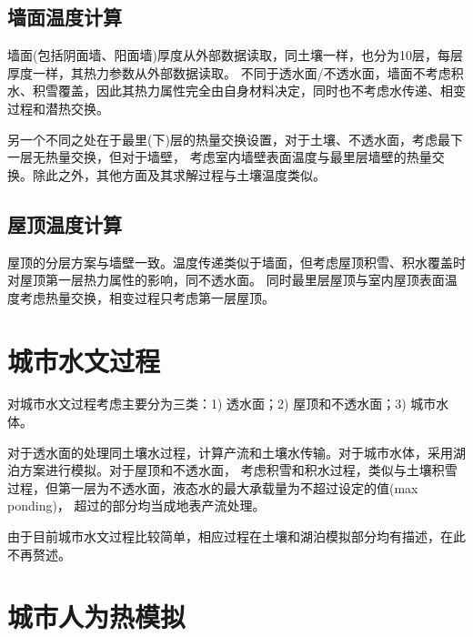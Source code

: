 \subsection{墙面温度计算}
墙面(包括阴面墙、阳面墙)厚度从外部数据读取，同土壤一样，也分为10层，每层厚度一样，其热力参数从外部数据读取。
不同于透水面/不透水面，墙面不考虑积水、积雪覆盖，因此其热力属性完全由自身材料决定，同时也不考虑水传递、相变过程和潜热交换。

另一个不同之处在于最里(下)层的热量交换设置，对于土壤、不透水面，考虑最下一层无热量交换，但对于墙壁，
考虑室内墙壁表面温度与最里层墙壁的热量交换。除此之外，其他方面及其求解过程与土壤温度类似。


\subsection{屋顶温度计算}
屋顶的分层方案与墙壁一致。温度传递类似于墙面，但考虑屋顶积雪、积水覆盖时对屋顶第一层热力属性的影响，同不透水面。
同时最里层屋顶与室内屋顶表面温度考虑热量交换，相变过程只考虑第一层屋顶。


\section{城市水文过程}
对城市水文过程考虑主要分为三类：1) 透水面；2) 屋顶和不透水面；3) 城市水体。

对于透水面的处理同土壤水过程，计算产流和土壤水传输。对于城市水体，采用湖泊方案进行模拟。对于屋顶和不透水面，
考虑积雪和积水过程，类似与土壤积雪过程，但第一层为不透水面，液态水的最大承载量为不超过设定的值(max ponding)，
超过的部分均当成地表产流处理。

由于目前城市水文过程比较简单，相应过程在土壤和湖泊模拟部分均有描述，在此不再赘述。


\section{城市人为热模拟}

